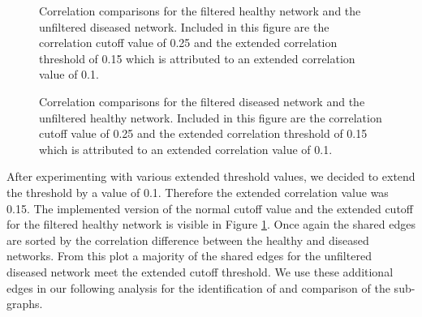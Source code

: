 \begin{figure}[!hbt]
    \centering
    \caption[Correlation comparisons for the filtered healthy network and the unfiltered diseased network.]{Correlation comparisons for the filtered healthy network and the unfiltered diseased network. Included in this figure are the correlation cutoff value of 0.25 and the extended correlation threshold of 0.15 which is attributed to an extended correlation value of 0.1.}
    \label{fig-cor-comp-h}
\end{figure}
\begin{figure}[!hbt]
    \centering
    \caption[Correlation comparisons for the filtered diseased network and the unfiltered healthy network.]{Correlation comparisons for the filtered diseased network and the unfiltered healthy network. Included in this figure are the correlation cutoff value of 0.25 and the extended correlation threshold of 0.15 which is attributed to an extended correlation value of 0.1.}
    \label{fig-cor-comp-d}
\end{figure}

After experimenting with various extended threshold values, we decided to extend the threshold by a value of 0.1. Therefore the extended correlation value was 0.15. The implemented version of the normal cutoff value and the extended cutoff for the filtered healthy network is visible in Figure \ref{fig-cor-comp-h}. Once again the shared edges are sorted by the correlation difference between the healthy and diseased networks. From this plot a majority of the shared edges for the unfiltered diseased network meet the extended cutoff threshold. We use these additional edges in our following analysis for the identification of and comparison of the sub-graphs.


